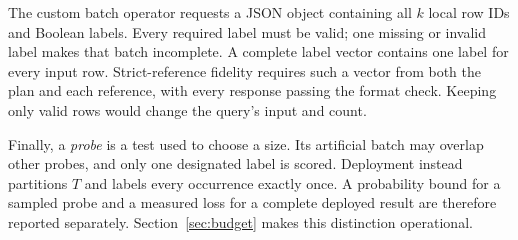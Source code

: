 The custom batch operator requests a JSON object containing all $k$ local row IDs and Boolean labels. Every required label must be valid; one missing or invalid label makes that batch incomplete. A complete label vector contains one label for every input row. Strict-reference fidelity requires such a vector from both the plan and each reference, with every response passing the format check. Keeping only valid rows would change the query's input and count.

Finally, a \emph{probe} is a test used to choose a size. Its artificial batch may overlap other probes, and only one designated label is scored. Deployment instead partitions $T$ and labels every occurrence exactly once. A probability bound for a sampled probe and a measured loss for a complete deployed result are therefore reported separately. Section~\ref{sec:budget} makes this distinction operational.
